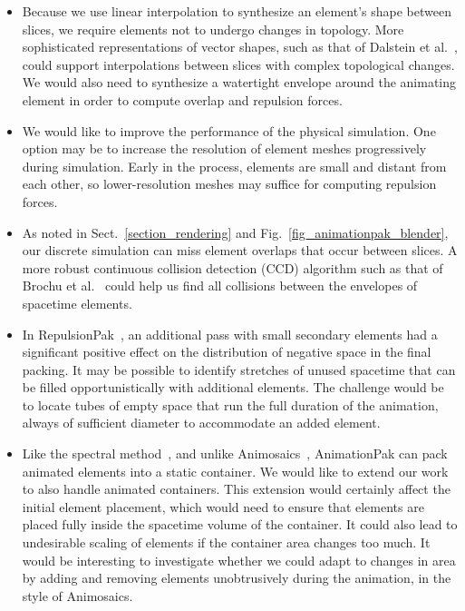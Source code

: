 \begin{itemize}
\item Because we use linear interpolation to synthesize an element's shape
	between slices, we require elements not to undergo changes in 
	topology.  More sophisticated representations of vector shapes,
	such as that of Dalstein et al.~\cite{Dalstein2015}, could support
	interpolations between slices with complex topological changes.
	We would also need to synthesize a watertight envelope around the
	animating element in order to compute overlap and repulsion forces.

\item We would like to improve the performance of the physical simulation.
	One option may be to increase the resolution of element meshes 
	progressively during simulation.  Early in the process, elements are
	small and distant from each other, so lower-resolution
	meshes may suffice for computing repulsion forces.

\item As noted in Sect.~\ref{section_rendering} and Fig.~\ref{fig_animationpak_blender},
	our discrete simulation can miss element overlaps that occur between
	slices.  A more robust continuous collision detection (CCD) algorithm
	such as that of Brochu et al.~\cite{Brochu2012}
	could help us find all collisions between
	the envelopes of spacetime elements.

\item In RepulsionPak~\cite{Saputra2018}, an additional pass with
	small secondary elements had a significant positive effect on the
	distribution of negative space in the final packing.  It may be
	possible to identify stretches of unused spacetime that can be filled
	opportunistically with additional elements.  The challenge would be
	to locate tubes of empty space that run the full duration of the
	animation, always of sufficient diameter to accommodate an added
	element.

\item Like the spectral method~\cite{Dalal2006}, and unlike
	Animosaics~\cite{Smith2005}, AnimationPak can pack animated 
	elements into a static container.  We would like to extend
	our work to also handle animated containers.  This extension
	would certainly affect the initial element placement, which 
	would need to ensure that elements are placed fully inside the
	spacetime volume of the container.  It could also lead to undesirable
	scaling of elements if the container area changes too much.  It would
	be interesting to investigate whether we could adapt to changes in
	area by adding and removing elements unobtrusively during
	the animation, in the style of Animosaics.


\end{itemize}
